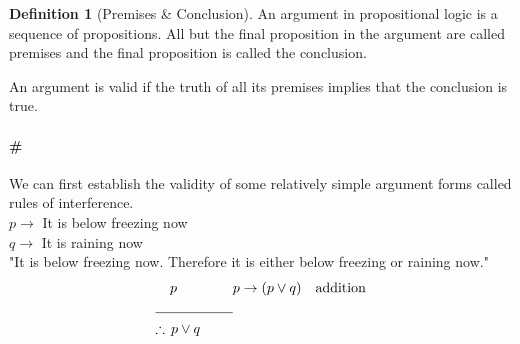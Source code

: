 \documentclass[12pt,oneside,a4paper]{book}
\theoremstyle{remark}
\theoremstyle{definition}
\newtheorem{defn}{Definition}
\begin{document}
\begin{defn}[Premises \& Conclusion]
    An argument in propositional logic is a sequence of propositions. All but the final proposition in the argument are called premises and the final proposition is called the conclusion.

    An argument is valid if the truth of all its premises implies that the conclusion is true.
\end{defn}
\paragraph{\#}
We can first establish the validity of some relatively simple argument forms called rules of interference.\\
\(p\to\) It is below freezing now\\
\(q\to\) It is raining now\\
"It is below freezing now. Therefore it is either below freezing or raining now."\\
\begin{align*}
    p \qquad\qquad                   & p\to(p\vee q)\quad \text{addition} \\
    \cline{1-1}
    \therefore\, p \vee q \qquad\,\, &                                    \\
\end{align*}
\end{document}
